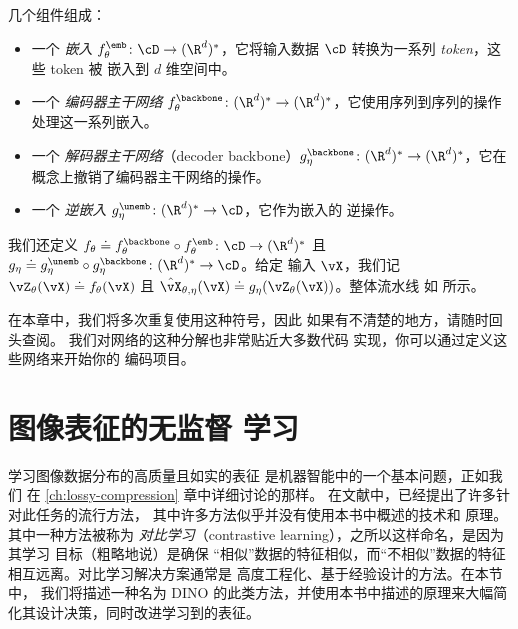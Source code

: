 \documentclass[../../book-main_zh.tex]{subfiles}
\begin{document}
\begin{itemize}
        几个组件组成：
        \begin{itemize}
            \item 一个 \textit{嵌入} \(f_{\theta}^{\emb} \colon
                \cD \to (\R^{d})^{*}\)，它将输入数据
                \(\cD\) 转换为一系列 \textit{token}，这些 token 被
                嵌入到 \(d\) 维空间中。
            \item 一个 \textit{编码器主干网络}
                \(f_{\theta}^{\backbone} \colon (\R^{d})^{*} \to
                (\R^{d})^{*}\)，它使用序列到序列的操作
                处理这一系列嵌入。
            \item 一个 \textit{解码器主干网络}（decoder backbone）\(g_{\eta}^{\backbone}
                \colon (\R^{d})^{*} \to (\R^{d})^{*}\)，它在
                概念上撤销了编码器主干网络的操作。
            \item 一个 \textit{逆嵌入} \(g_{\eta}^{\unemb} \colon
                (\R^{d})^{*} \to \cD\)，它作为嵌入的
                逆操作。
        \end{itemize}
        我们还定义 \(f_{\theta} \doteq f_{\theta}^{\backbone}
        \circ f_{\theta}^{\emb} \colon \cD \to (\R^{d})^{*}\) 且
        \(g_{\eta} \doteq g_{\eta}^{\unemb} \circ
        g_{\eta}^{\backbone} \colon (\R^{d})^{*} \to \cD\)。给定
        输入 \(\vX\)，我们记 \(\vZ_{\theta}(\vX) \doteq
        f_{\theta}(\vX)\) 且 \(\hat{\vX}_{\theta, \eta}(\vX) \doteq
        g_{\eta}(\vZ_{\theta}(\vX))\)。整体流水线
        如  所示。
\end{itemize}

在本章中，我们将多次重复使用这种符号，因此
如果有不清楚的地方，请随时回头查阅。
我们对网络的这种分解也非常贴近大多数代码
实现，你可以通过定义这些网络来开始你的
编码项目。

\section{图像表征的无监督
学习}\label{sec:contrastive_learning}

学习图像数据分布的高质量且如实的表征
是机器智能中的一个基本问题，正如我们
在 \ref{ch:lossy-compression} 章中详细讨论的那样。
在文献中，已经提出了许多针对此任务的流行方法，
其中许多方法似乎并没有使用本书中概述的技术和
原理。其中一种方法被称为
\textit{对比学习}（contrastive learning），之所以这样命名，是因为其学习
目标（粗略地说）是确保
“相似”数据的特征相似，而“不相似”数据的特征
相互远离。对比学习解决方案通常是
高度工程化、基于经验设计的方法。在本节中，
我们将描述一种名为 DINO \citep{caron2021emerging} 的此类方法，并使用本书中描述的原理来大幅简化其设计决策，同时改进学习到的表征。
\end{document}

